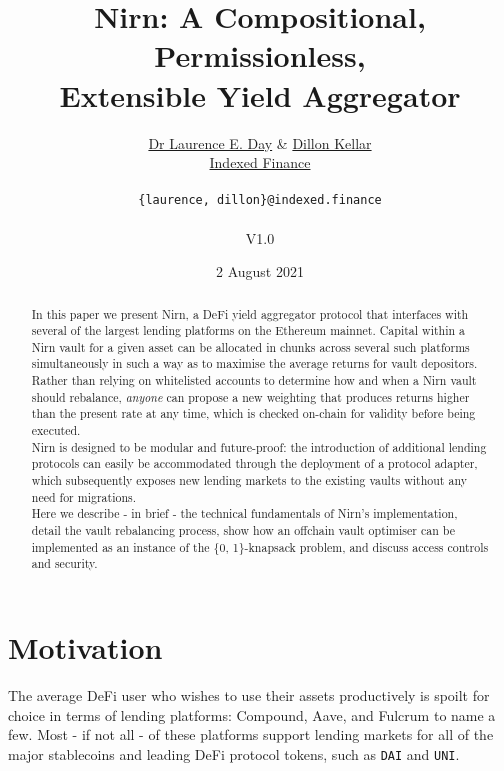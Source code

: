 \documentclass{article}
\title{Nirn: A Compositional, Permissionless,\\ Extensible Yield Aggregator}
\author{\href{https://twitter.com/laurence_e_day}{Dr Laurence E. Day} \& \href{https://twitter.com/d1ll0nk}{Dillon Kellar}\\\href{https://indexed.finance}{Indexed Finance}\\\\\texttt{\{laurence, dillon\}@indexed.finance}\\\\V1.0}
\date{2 August 2021}
\begin{document}
\maketitle

\begin{abstract}
\noindent
    In this paper we present Nirn, a DeFi yield aggregator protocol that interfaces with several of the largest lending platforms on the Ethereum mainnet. Capital within a Nirn vault for a given asset can be allocated in chunks across several such platforms simultaneously in such a way as to maximise the average returns for vault depositors.\\
    
    \noindent
    Rather than relying on whitelisted accounts to determine how and when a Nirn vault should rebalance, \textit{anyone} can propose a new weighting that produces returns higher than the present rate at any time, which is checked on-chain for validity before being executed.\\
    
    \noindent
    Nirn is designed to be modular and future-proof: the introduction of additional lending protocols can easily be accommodated through the deployment of a protocol adapter, which subsequently exposes new lending markets to the existing vaults without any need for migrations.\\
    
    \noindent
    Here we describe - in brief - the technical fundamentals of Nirn's implementation, detail the vault rebalancing process, show how an offchain vault optimiser can be implemented as an instance of the \{0, 1\}-knapsack problem, and discuss access controls and security.\\
    
\end{abstract}

\newpage
\tableofcontents

\newpage
\section{Motivation}

The average DeFi user who wishes to use their assets productively is spoilt for choice in terms of lending platforms: Compound, Aave, and Fulcrum to name a few. Most - if not all - of these platforms support lending markets for all of the major stablecoins and leading DeFi protocol tokens, such as \texttt{DAI} and \texttt{UNI}.\\
\end{document}
